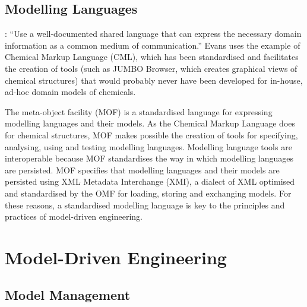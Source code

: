 

\subsection{Modelling Languages}

\cite[pg377]{evans04domain}: ``Use a well-documented shared language that can express the necessary domain information as a common medium of communication.'' Evans uses the example of Chemical Markup Language (CML), which has been standardised and facilitates the creation of tools (such as JUMBO Browser, which creates graphical views of chemical structures) that would probably never have been developed for in-house, ad-hoc domain models of chemicals.



The meta-object facility (MOF) is a standardised language for expressing modelling languages and their models. As the Chemical Markup Language does for chemical structures, MOF makes possible the creation of tools for specifying, analysing, using and testing modelling languages. Modelling language tools are interoperable because MOF standardises the way in which modelling languages are persisted. MOF specifies that modelling languages and their models are persisted using XML Metadata Interchange (XMI), a dialect of XML optimised and standardised by the OMF for loading, storing and exchanging models. For these reasons, a standardised modelling language is key to the principles and practices of model-driven engineering. 


\section{Model-Driven Engineering}
\label{sec:mde}

\subsection{Model Management}

